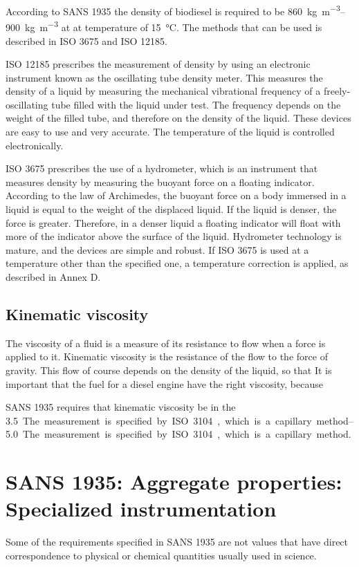 According to SANS 1935 the density of biodiesel is required to be
\SIrange{860}{900}{\kilogram\per\cubic\metre} at at temperature of
\SI{15}{\celsius}. The methods that can be used is described in ISO 3675 and ISO
12185.

ISO 12185 prescribes the measurement of density by using an electronic
instrument known as the oscillating tube density meter. This measures the
density of a liquid by measuring the mechanical vibrational frequency of a
freely-oscillating tube filled with the liquid under test. The frequency depends
on the weight of the filled tube, and therefore on the density of the liquid.
These devices are easy to use and very accurate. The temperature of the liquid
is controlled electronically.

ISO 3675 prescribes the use of a hydrometer, which is an instrument that
measures density by measuring the buoyant force on a floating indicator.
According to the law of Archimedes, the buoyant force on a body immersed in a
liquid is equal to the weight of the displaced liquid. If the liquid is denser,
the force is greater. Therefore, in a denser liquid a floating indicator will
float with more of the indicator above the surface of the liquid. Hydrometer
technology is mature, and the devices are simple and robust.  If ISO 3675 is
used at a temperature other than the specified one, a temperature correction is
applied, as described in Annex D.

\subsection{Kinematic viscosity}

The viscosity of a fluid is a measure of its resistance to flow when a force is
applied to it. Kinematic viscosity is the resistance of the flow to the force of
gravity. This flow of course depends on the density of the liquid, so that It is
important that the fuel for a diesel engine have the right viscosity, because

SANS 1935 requires that kinematic viscosity be in the \SIrange{3.5}{5.0}. The
measurement is specified by ISO 3104, which is a capillary method.

\section{SANS 1935: Aggregate properties: Specialized instrumentation}

Some of the requirements specified in SANS 1935 are not values that have direct
correspondence to physical or chemical quantities usually used in science. 

